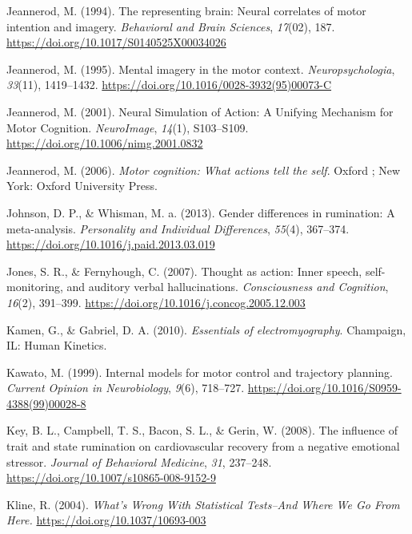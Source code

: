 \documentclass[a4paper,12pt,twoside,openright,oldfontcommands]{memoir}
\begin{document}
\hypertarget{ref-jeannerod_representing_1994}{}
Jeannerod, M. (1994). The representing brain: Neural correlates of motor
intention and imagery. \emph{Behavioral and Brain Sciences},
\emph{17}(02), 187. \url{https://doi.org/10.1017/S0140525X00034026}

\hypertarget{ref-jeannerod_mental_1995}{}
Jeannerod, M. (1995). Mental imagery in the motor context.
\emph{Neuropsychologia}, \emph{33}(11), 1419--1432.
\url{https://doi.org/10.1016/0028-3932(95)00073-C}

\hypertarget{ref-jeannerod_neural_2001}{}
Jeannerod, M. (2001). Neural Simulation of Action: A Unifying Mechanism
for Motor Cognition. \emph{NeuroImage}, \emph{14}(1), S103--S109.
\url{https://doi.org/10.1006/nimg.2001.0832}

\hypertarget{ref-jeannerod_motor_2006}{}
Jeannerod, M. (2006). \emph{Motor cognition: What actions tell the
self}. Oxford ; New York: Oxford University Press.

\hypertarget{ref-Johnson2013}{}
Johnson, D. P., \& Whisman, M. a. (2013). Gender differences in
rumination: A meta-analysis. \emph{Personality and Individual
Differences}, \emph{55}(4), 367--374.
\url{https://doi.org/10.1016/j.paid.2013.03.019}

\hypertarget{ref-Jones2007}{}
Jones, S. R., \& Fernyhough, C. (2007). Thought as action: Inner speech,
self-monitoring, and auditory verbal hallucinations. \emph{Consciousness
and Cognition}, \emph{16}(2), 391--399.
\url{https://doi.org/10.1016/j.concog.2005.12.003}

\hypertarget{ref-kamen_essentials_2010}{}
Kamen, G., \& Gabriel, D. A. (2010). \emph{Essentials of
electromyography}. Champaign, IL: Human Kinetics.

\hypertarget{ref-kawato_internal_1999}{}
Kawato, M. (1999). Internal models for motor control and trajectory
planning. \emph{Current Opinion in Neurobiology}, \emph{9}(6), 718--727.
\url{https://doi.org/10.1016/S0959-4388(99)00028-8}

\hypertarget{ref-Key2008}{}
Key, B. L., Campbell, T. S., Bacon, S. L., \& Gerin, W. (2008). The
influence of trait and state rumination on cardiovascular recovery from
a negative emotional stressor. \emph{Journal of Behavioral Medicine},
\emph{31}, 237--248. \url{https://doi.org/10.1007/s10865-008-9152-9}

\hypertarget{ref-Kline2004}{}
Kline, R. (2004). \emph{What's Wrong With Statistical Tests--And Where
We Go From Here.} \url{https://doi.org/10.1037/10693-003}
\end{document}
